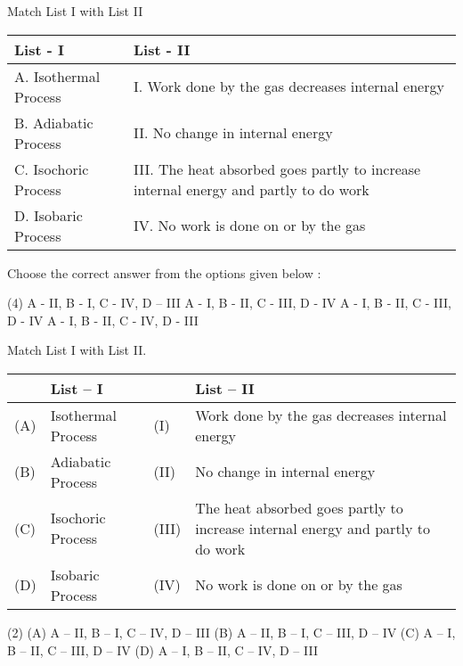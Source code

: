 \item Match List I with List II
    \begin{center}
        \begin{tabular}{|l|l|}
            \hline
            \textbf{List - I} & \textbf{List - II} \\
            \hline
            A. Isothermal Process & I. Work done by the gas decreases internal energy \\
            \hline
            B. Adiabatic Process & II. No change in internal energy \\
            \hline
            C. Isochoric Process & III. The heat absorbed goes partly to increase internal energy and partly to do work \\
            \hline
            D. Isobaric Process & IV. No work is done on or by the gas \\
            \hline
        \end{tabular}
    \end{center}
    Choose the correct answer from the options given below :
    \begin{tasks}(4)
        \task A - II, B - I, C - IV, D – III
        \task A - I, B - II, C - III, D - IV
        \task A - I, B - II, C - III, D - IV
        \task A - I, B - II, C - IV, D - III
    \end{tasks}\item Match List I with List II.
\begin{center}
    \renewcommand{\arraystretch}{1.5}
    \begin{table}[h]
        \centering
        \begin{tabular}{p{0.25cm}p{6cm}|p{0.25cm}p{6cm}}
        \hline
        & \textbf{List -- I} & & \textbf{List -- II} \\
        \hline
        (A) & Isothermal Process & (I) & Work done by the gas decreases internal energy \\
        (B) & Adiabatic Process & (II) & No change in internal energy \\
        (C) & Isochoric Process & (III) & The heat absorbed goes partly to increase internal energy and partly to do work \\
        (D) & Isobaric Process & (IV) & No work is done on or by the gas \\
        \hline
        \end{tabular}
    \end{table}
\end{center}

\begin{tasks}(2)
    \task (A) A – II, B – I, C – IV, D – III
    \task (B) A – II, B – I, C – III, D – IV
    \task (C) A – I, B – II, C – III, D – IV
    \task (D) A – I, B – II, C – IV, D – III
\end{tasks}